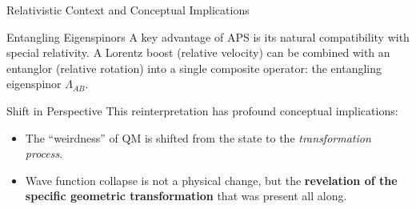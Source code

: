 \begin{frame}{Relativistic Context and Conceptual Implications}
  \begin{block}{Entangling Eigenspinors}
    A key advantage of APS is its natural compatibility with special
    relativity.
    \pause
    A Lorentz boost (relative velocity) can be combined with an entanglor
    (relative rotation) into a single composite operator: the
    \alert{entangling eigenspinor} $\Lambda_{AB}$.
  \end{block}
  \pause
  \begin{alertblock}{Shift in Perspective}
    This reinterpretation has profound conceptual implications:
    \begin{itemize}
      \item The ``weirdness'' of QM is shifted from the state to the
        \emph{transformation process}.
      \pause
      \item Wave function collapse is not a physical change, but the
        \textbf{revelation of the specific geometric transformation} that
        was present all along.
    \end{itemize}
  \end{alertblock}
\end{frame}
